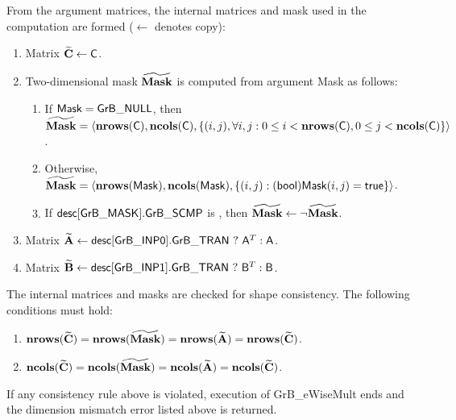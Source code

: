From the argument matrices, the internal matrices and mask used in the computation are formed ($\leftarrow$ denotes copy):
\begin{enumerate}
	\item Matrix ${\bf \widetilde{C}} \leftarrow {\sf C}$.

	\item Two-dimensional mask ${\bf \widetilde{Mask}}$ is computed from argument {\sf Mask} as follows:
	\begin{enumerate}

		\item	If ${\sf Mask} = {\sf GrB\_NULL}$, then ${\bf \widetilde{Mask}} = \langle \bold{nrows}({\sf C}), \bold{ncols}({\sf C}), \{(i,j), \forall i,j : 0 \leq i <  \bold{nrows}({\sf C}), 0 \leq j < \bold{ncols}({\sf C}) \} \rangle$.

		\item	Otherwise, ${\bf \widetilde{Mask}} = \langle \bold{nrows}({\sf Mask}), \bold{ncols}({\sf Mask}), \{(i,j) : ({\sf bool}){\sf Mask}(i,j) = {\sf true}\} \rangle$.

		\item	If ${\sf desc[GrB\_MASK].GrB\_SCMP}$ is \true, then ${\bf \widetilde{Mask}} \leftarrow \neg {\bf \widetilde{Mask}}$.

	\end{enumerate}

	\item Matrix ${\bf \widetilde{A}} \leftarrow {\sf desc[GrB\_INP0].GrB\_TRAN} \ ? \ {\sf A}^T : {\sf A}$.

	\item Matrix ${\bf \widetilde{B}} \leftarrow {\sf desc[GrB\_INP1].GrB\_TRAN} \ ? \ {\sf B}^T : {\sf B}$.
\end{enumerate}

The internal matrices and masks are checked for shape consistency. The following conditions must hold:
\begin{enumerate}	
	\item $\bold{nrows}({\bf \widetilde{C}}) = \bold{nrows}({\bf \widetilde{Mask}})
	     = \bold{nrows}({\bf \widetilde{A}}) = \bold{nrows}({\bf \widetilde{C}})$.

	\item $\bold{ncols}({\bf \widetilde{C}}) = \bold{ncols}({\bf \widetilde{Mask}})
	     = \bold{ncols}({\bf \widetilde{A}}) = \bold{ncols}({\bf \widetilde{C}})$.
\end{enumerate}
If any consistency rule above is violated, execution of {\sf GrB\_eWiseMult} ends and the dimension mismatch error listed above is returned.

